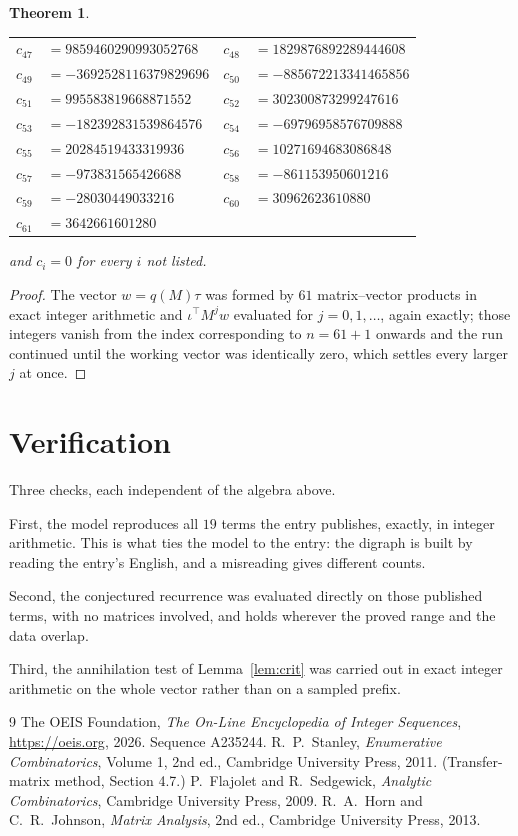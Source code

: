 \documentclass[11pt,a4paper]{article}
\theoremstyle{plain}
\newtheorem{theorem}{Theorem}
\theoremstyle{definition}
\begin{document}
\begin{theorem}
\begin{center}
\begin{tabular}{r@{\,}l@{\qquad}r@{\,}l}
$c_{47}$ & $=9859460290993052768$ & $c_{48}$ & $=1829876892289444608$ \\
$c_{49}$ & $=-3692528116379829696$ & $c_{50}$ & $=-885672213341465856$ \\
$c_{51}$ & $=995583819668871552$ & $c_{52}$ & $=302300873299247616$ \\
$c_{53}$ & $=-182392831539864576$ & $c_{54}$ & $=-69796958576709888$ \\
$c_{55}$ & $=20284519433319936$ & $c_{56}$ & $=10271694683086848$ \\
$c_{57}$ & $=-973831565426688$ & $c_{58}$ & $=-861153950601216$ \\
$c_{59}$ & $=-28030449033216$ & $c_{60}$ & $=30962623610880$ \\
$c_{61}$ & $=3642661601280$ \\
\end{tabular}
\end{center}
and $c_i=0$ for every $i$ not listed.
\end{theorem}

\begin{proof}
The vector $w=q(M)\tau$ was formed by $61$ matrix--vector products in exact integer
arithmetic and $\iota^{\!\top}M^{j}w$ evaluated for $j=0,1,\dots$, again exactly; those
integers vanish from the index corresponding to $n=61+1$ onwards and the run continued
until the working vector was identically zero, which settles every larger $j$ at once.
\end{proof}

\section{Verification}

Three checks, each independent of the algebra above.

First, the model reproduces all $19$ terms the entry publishes, exactly, in integer
arithmetic. This is what ties the model to the entry: the digraph is built by reading the
entry's English, and a misreading gives different counts.

Second, the conjectured recurrence was evaluated directly on those published terms, with no
matrices involved, and holds wherever the proved range and the data overlap.

Third, the annihilation test of Lemma~\ref{lem:crit} was carried out in exact integer
arithmetic on the whole vector rather than on a sampled prefix.

\begin{thebibliography}{9}
 The OEIS Foundation, \emph{The On-Line Encyclopedia of Integer
Sequences}, \url{https://oeis.org}, 2026. Sequence A235244.
 R.~P.~Stanley, \emph{Enumerative Combinatorics}, Volume 1, 2nd ed.,
Cambridge University Press, 2011. (Transfer-matrix method, Section 4.7.)
 P.~Flajolet and R.~Sedgewick, \emph{Analytic Combinatorics}, Cambridge
University Press, 2009.
 R.~A.~Horn and C.~R.~Johnson, \emph{Matrix Analysis}, 2nd ed., Cambridge
University Press, 2013.
\end{thebibliography}
\end{document}
